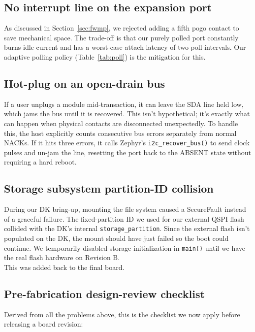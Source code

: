 \documentclass[12pt, a4paper]{article}
\begin{document}
\subsection{No interrupt line on the expansion port}

As discussed in Section~\ref{sec:fwmp}, we rejected adding a fifth pogo contact to save mechanical space. The trade-off is that our purely polled port constantly burns idle current and has a worst-case attach latency of two poll intervals. Our adaptive polling policy (Table~\ref{tab:poll}) is the mitigation for this.

\subsection{Hot-plug on an open-drain bus}

If a user unplugs a module mid-transaction, it can leave the SDA line held low, which jams the bus until it is recovered. This isn't hypothetical; it's exactly what can happen when physical contacts are disconnected unexpectedly. To handle this, the host explicitly counts consecutive bus errors separately from normal NACKs. If it hits three errors, it calls Zephyr's \texttt{i2c\_recover\_bus()} to send clock pulses and un-jam the line, resetting the port back to the ABSENT state without requiring a hard reboot.

\subsection{Storage subsystem partition-ID collision}

During our DK bring-up, mounting the file system caused a SecureFault instead of a graceful failure. The fixed-partition ID we used for our external QSPI flash collided with the DK's internal \texttt{storage\_partition}. Since the external flash isn't populated on the DK, the mount should have just failed so the boot could continue. We temporarily disabled storage initialization in \texttt{main()} until we have the real flash hardware on Revision B.\\
This was added back to the final board.

\subsection{Pre-fabrication design-review checklist}
\label{sec:challenges:checklist}

Derived from all the problems above, this is the checklist we now apply before releasing a board revision:
\end{document}
